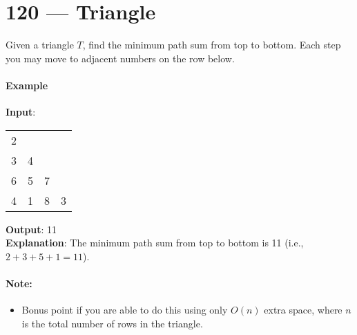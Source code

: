 \section{120 --- Triangle}
Given a triangle $T$, find the minimum path sum from top to bottom. Each step you may move to adjacent numbers on the row below.
\paragraph{Example}
\begin{flushleft}
\textbf{Input}:
\begin{table}[H]
\begin{tabular}{llll}
2 &   &   &   \\
3 & 4 &   &   \\
6 & 5 & 7 &   \\
4 & 1 & 8 & 3
\end{tabular}
\end{table}
\textbf{Output}: 11
\\
\textbf{Explanation}:
The minimum path sum from top to bottom is 11 (i.e., $2 + 3 + 5 + 1 = 11$).
\end{flushleft}
\paragraph{Note:}
\begin{itemize}
\item Bonus point if you are able to do this using only $O(n)$ extra space, where $n$ is the total number of rows in the triangle.
\end{itemize}

